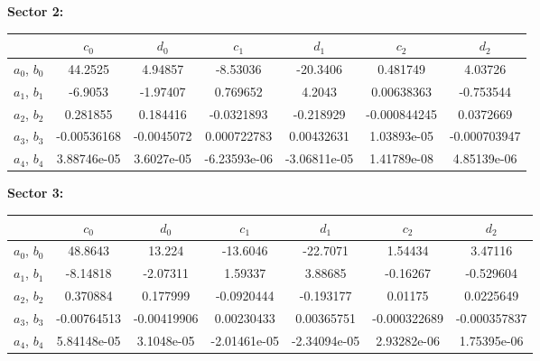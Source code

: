 {\bf Sector 2:}
\begin{table}[h]
\scriptsize
 \begin{center}
  \begin{tabular}{c|c|c|c|c|c|c}
    \hline 
    & $c_0$ & $d_0$ & $c_1$ & $d_1$     & $c_2$ & $d_2$ \\
    \hline  
   $a_0$, $b_0$ &  44.2525  &  4.94857  &  -8.53036  &  -20.3406  &  0.481749  &  4.03726   \\
   $a_1$, $b_1$ &  -6.9053  &  -1.97407  &  0.769652  &  4.2043  &  0.00638363  &  -0.753544  \\
   $a_2$, $b_2$ &  0.281855  &  0.184416  &  -0.0321893  &  -0.218929  &  -0.000844245  &  0.0372669  \\
   $a_3$, $b_3$ &   -0.00536168  &  -0.0045072 &   0.000722783  &  0.00432631  &  1.03893e-05  &  -0.000703947  \\
   $a_4$, $b_4$ &   3.88746e-05  &  3.6027e-05  &  -6.23593e-06  &  -3.06811e-05  &  1.41789e-08 &   4.85139e-06  \\
 \hline
  \end{tabular}
 \end{center} 
\end{table}

\vspace{0.5cm}


{\bf Sector 3:}
\begin{table}[h]
\scriptsize
 \begin{center}
  \begin{tabular}{c|c|c|c|c|c|c}
    \hline 
    & $c_0$ & $d_0$ & $c_1$ & $d_1$     & $c_2$ & $d_2$ \\
    \hline  
   $a_0$, $b_0$ &  48.8643  &  13.224  &  -13.6046  &  -22.7071  &  1.54434  &  3.47116   \\
   $a_1$, $b_1$ &  -8.14818  &  -2.07311  &  1.59337  &  3.88685  &  -0.16267  &  -0.529604  \\ 
   $a_2$, $b_2$ & 0.370884  &  0.177999  &  -0.0920444  &  -0.193177  &  0.01175  &  0.0225649  \\
   $a_3$, $b_3$ &  -0.00764513  &  -0.00419906  &  0.00230433  &  0.00365751  &  -0.000322689  &  -0.000357837  \\
   $a_4$, $b_4$ & 5.84148e-05  &  3.1048e-05  &  -2.01461e-05  &  -2.34094e-05  &  2.93282e-06  &  1.75395e-06  \\ 
 \hline
  \end{tabular}
 \end{center} 
\end{table}


